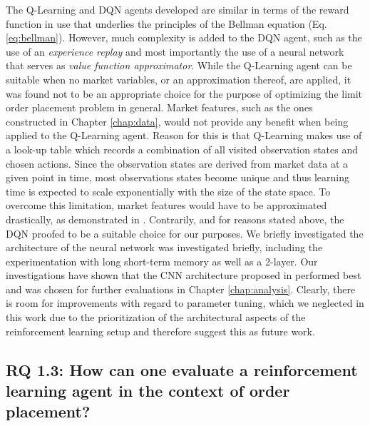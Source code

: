     The Q-Learning and DQN agents developed are similar in terms of the reward function in use that underlies the principles of the Bellman equation (Eq. \ref{eq:bellman}).
    However, much complexity is added to the DQN agent, such as the use of an \textit{experience replay} and most importantly the use of a neural network that serves as \textit{value function approximator}.
    While the Q-Learning agent can be suitable when no market variables, or an approximation thereof, are applied, it was found not to be an appropriate choice for the purpose of optimizing the limit order placement problem in general.
    Market features, such as the ones constructed in Chapter \ref{chap:data}, would not provide any benefit when being applied to the Q-Learning agent.
    Reason for this is that Q-Learning makes use of a look-up table which records a combination of all visited observation states and chosen actions.
    Since the observation states are derived from market data at a given point in time, most observations states become unique and thus learning time is expected to scale exponentially with the size of the state space\cite{whitehead1991complexity}.
    To overcome this limitation, market features would have to be approximated drastically, as demonstrated in \cite{nevmyvaka2006reinforcement}.
    Contrarily, and for reasons stated above, the DQN proofed to be a suitable choice for our purposes.
    We briefly investigated the architecture of the neural network was investigated briefly, including the experimentation with long short-term memory\cite{} as well as a 2-layer.
    Our investigations have shown that the CNN architecture proposed in \cite{mnih2015human} performed best and was chosen for further evaluations in Chapter \ref{chap:analysis}.
    Clearly, there is room for improvements with regard to parameter tuning, which we neglected in this work due to the prioritization of the architectural aspects of the reinforcement learning setup and therefore suggest this as future work.

\subsection{RQ 1.3: How can one evaluate a reinforcement learning agent in the context of order placement?}

